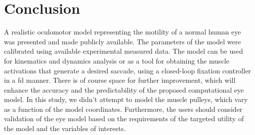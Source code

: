 \documentclass[11pt,a4paper,draft=false]{report}
\begin{document}
\section*{Conclusion}\label{sec:concluison}

A realistic oculomotor model representing the motility of a normal human eye was
presented and made publicly available. The parameters of the model were
calibrated using available experimental measured data. The model can be used for
kinematics and dynamics analysis or as a tool for obtaining the muscle
activations that generate a desired saccade, using a closed-loop fixation
controller in a \gls{fd} manner. There is of course space for further
improvement, which will enhance the accuracy and the predictability of the
proposed computational eye model. In this study, we didn't attempt to model the
muscle pulleys, which vary as a function of the model coordinates. Furthermore,
the users should consider validation of the eye model based on the requirements
of the targeted utility of the model and the variables of interests.




\end{document}
